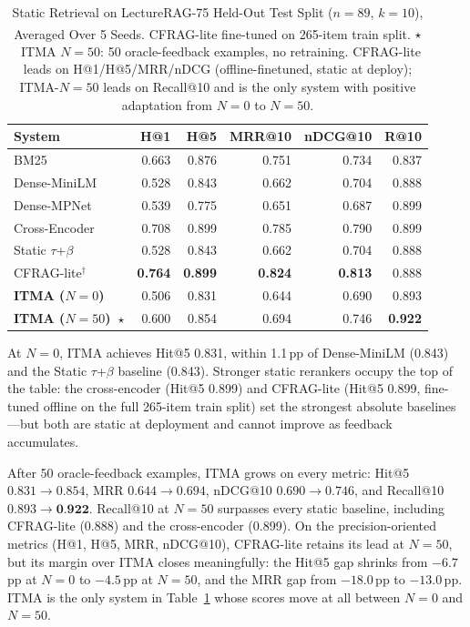\documentclass[journal]{IEEEtran}
\begin{document}
\begin{table}[!htbp]
\centering
\caption{Static Retrieval on LectureRAG-75 Held-Out Test Split
($n{=}89$, $k{=}10$), Averaged Over 5 Seeds.
\textsuperscript{\textdagger}CFRAG-lite fine-tuned on 265-item train split.
$\star$~ITMA $N{=}50$: 50 oracle-feedback examples, no retraining.
CFRAG-lite leads on H@1/H@5/MRR/nDCG (offline-finetuned, static at deploy);
ITMA-$N{=}50$ leads on Recall@10 and is the only system with positive
adaptation from $N{=}0$ to $N{=}50$.}
\label{tab:retrieval}
\small
\setlength{\tabcolsep}{4pt}
\begin{tabular}{lrrrrr}
\toprule
System & H@1 & H@5 & MRR@10 & nDCG@10 & R@10 \\
\midrule
BM25 & 0.663 & 0.876 & 0.751 & 0.734 & 0.837 \\
Dense-MiniLM & 0.528 & 0.843 & 0.662 & 0.704 & 0.888 \\
Dense-MPNet & 0.539 & 0.775 & 0.651 & 0.687 & 0.899 \\
Cross-Encoder & 0.708 & 0.899 & 0.785 & 0.790 & 0.899 \\
Static $\tau$+$\beta$ & 0.528 & 0.843 & 0.662 & 0.704 & 0.888 \\
CFRAG-lite$^\dagger$ & \textbf{0.764} & \textbf{0.899} & \textbf{0.824} & \textbf{0.813} & 0.888 \\
\midrule
\textbf{ITMA ($N{=}0$)} & 0.506 & 0.831 & 0.644 & 0.690 & 0.893 \\
\textbf{ITMA ($N{=}50$)~$\star$} & 0.600 & 0.854 & 0.694 & 0.746 & \textbf{0.922} \\
\bottomrule
\end{tabular}
\end{table}

At $N{=}0$, ITMA achieves Hit@5 0.831, within 1.1\,pp of Dense-MiniLM
(0.843) and the Static $\tau$+$\beta$ baseline (0.843).  Stronger static
rerankers occupy the top of the table: the cross-encoder (Hit@5 0.899)
and CFRAG-lite (Hit@5 0.899, fine-tuned offline on the full 265-item
train split) set the strongest absolute baselines---but both are static
at deployment and cannot improve as feedback accumulates.

After 50 oracle-feedback examples, ITMA grows on every metric: Hit@5
$0.831\rightarrow 0.854$, MRR $0.644\rightarrow 0.694$, nDCG@10
$0.690\rightarrow 0.746$, and Recall@10
$0.893\rightarrow \textbf{0.922}$.  Recall@10 at $N{=}50$ surpasses
every static baseline, including CFRAG-lite (0.888) and the cross-encoder
(0.899).  On the precision-oriented metrics (H@1, H@5, MRR, nDCG@10),
CFRAG-lite retains its lead at $N{=}50$, but its margin over ITMA
closes meaningfully: the Hit@5 gap shrinks from $-6.7$\,pp at $N{=}0$
to $-4.5$\,pp at $N{=}50$, and the MRR gap from $-18.0$\,pp to
$-13.0$\,pp.  ITMA is the only system in Table~\ref{tab:retrieval}
whose scores move at all between $N{=}0$ and $N{=}50$.
\end{document}
